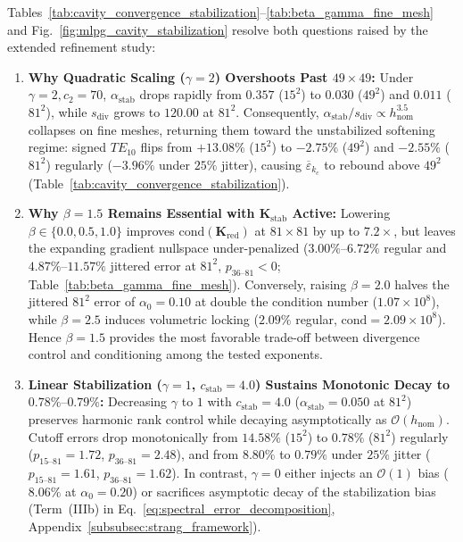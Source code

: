 \documentclass[VANCOUVER]{USG}
\begin{document}
Tables~\ref{tab:cavity_convergence_stabilization}--\ref{tab:beta_gamma_fine_mesh} and Fig.~\ref{fig:mlpg_cavity_stabilization} resolve both questions raised by the extended refinement study:
\begin{enumerate}
    \item \textbf{Why Quadratic Scaling ($\gamma = 2$) Overshoots Past $49 \times 49$:} Under $\gamma = 2, c_2 = 70$, $\alpha_{\mathrm{stab}}$ drops rapidly from $0.357$ ($15^2$) to $0.030$ ($49^2$) and $0.011$ ($81^2$), while $s_{\mathrm{div}}$ grows to $120.00$ at $81^2$. Consequently, $\alpha_{\mathrm{stab}}/s_{\mathrm{div}} \propto h_{\mathrm{nom}}^{3.5}$ collapses on fine meshes, returning them toward the unstabilized softening regime: signed $TE_{10}$ flips from $+13.08\%$ ($15^2$) to $-2.75\%$ ($49^2$) and $-2.55\%$ ($81^2$) regularly ($-3.96\%$ under $25\%$ jitter), causing $\overline{\varepsilon}_{k_c}$ to rebound above $49^2$ (Table~\ref{tab:cavity_convergence_stabilization}).
    \item \textbf{Why $\beta = 1.5$ Remains Essential with $\mathbf{K}_{\mathrm{stab}}$ Active:} Lowering $\beta \in \{0.0, 0.5, 1.0\}$ improves $\mathrm{cond}(\mathbf{K}_{\mathrm{red}})$ at $81\times 81$ by up to $7.2\times$, but leaves the expanding gradient nullspace under-penalized ($3.00\%\text{--}6.72\%$ regular and $4.87\%\text{--}11.57\%$ jittered error at $81^2$, $p_{36\text{--}81} < 0$; Table~\ref{tab:beta_gamma_fine_mesh}). Conversely, raising $\beta = 2.0$ halves the jittered $81^2$ error of $\alpha_0 = 0.10$ at double the condition number ($1.07\times 10^8$), while $\beta = 2.5$ induces volumetric locking ($2.09\%$ regular, $\mathrm{cond} = 2.09\times 10^8$). Hence $\beta = 1.5$ provides the most favorable trade-off between divergence control and conditioning among the tested exponents.
    \item \textbf{Linear Stabilization ($\gamma = 1$, $c_{\mathrm{stab}} = 4.0$) Sustains Monotonic Decay to $0.78\%\text{--}0.79\%$:} Decreasing $\gamma$ to $1$ with $c_{\mathrm{stab}} = 4.0$ ($\alpha_{\mathrm{stab}} = 0.050$ at $81^2$) preserves harmonic rank control while decaying asymptotically as $\mathcal{O}(h_{\mathrm{nom}})$. Cutoff errors drop monotonically from $14.58\%$ ($15^2$) to $\mathbf{0.78\%}$ ($81^2$) regularly ($p_{15\text{--}81} = 1.72$, $p_{36\text{--}81} = 2.48$), and from $8.80\%$ to $\mathbf{0.79\%}$ under $25\%$ jitter ($p_{15\text{--}81} = 1.61$, $p_{36\text{--}81} = 1.62$). In contrast, $\gamma = 0$ either injects an $\mathcal{O}(1)$ bias ($8.06\%$ at $\alpha_0 = 0.20$) or sacrifices asymptotic decay of the stabilization bias (Term~(IIIb) in Eq.~\eqref{eq:spectral_error_decomposition}, Appendix~\ref{subsubsec:strang_framework}).

\end{enumerate}
\end{document}
